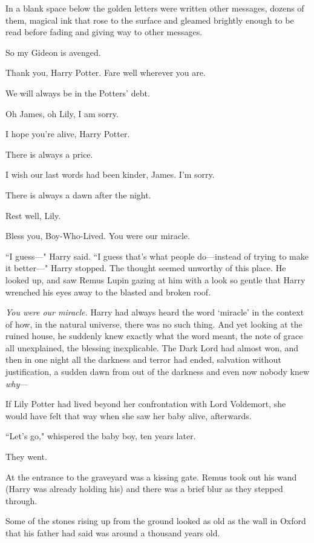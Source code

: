 In a blank space below the golden letters were written other messages, dozens of them, magical ink that rose to the surface and gleamed brightly enough to be read before fading and giving way to other messages.

\begin{center}
So my Gideon is avenged.

Thank you, Harry Potter. Fare well wherever you are.

We will always be in the Potters' debt.

Oh James, oh Lily, I am sorry.

I hope you're alive, Harry Potter.

There is always a price.

I wish our last words had been kinder, James. I'm sorry.

There is always a dawn after the night.

Rest well, Lily.

Bless you, Boy-Who-Lived. You were our miracle.
\end{center}

``I guess—" Harry said. ``I guess that's what people do—instead of trying to make it better—" Harry stopped. The thought seemed unworthy of this place. He looked up, and saw Remus Lupin gazing at him with a look so gentle that Harry wrenched his eyes away to the blasted and broken roof.

\emph{You were our miracle.} Harry had always heard the word `miracle' in the context of how, in the natural universe, there was no such thing. And yet looking at the ruined house, he suddenly knew exactly what the word meant, the note of grace all unexplained, the blessing inexplicable. The Dark Lord had almost won, and then in one night all the darkness and terror had ended, salvation without justification, a sudden dawn from out of the darkness and even now nobody knew \emph{why}—

If Lily Potter had lived beyond her confrontation with Lord Voldemort, she would have felt that way when she saw her baby alive, afterwards.

``Let's go," whispered the baby boy, ten years later.

They went.

At the entrance to the graveyard was a kissing gate. Remus took out his wand (Harry was already holding his) and there was a brief blur as they stepped through.

Some of the stones rising up from the ground looked as old as the wall in Oxford that his father had said was around a thousand years old.

